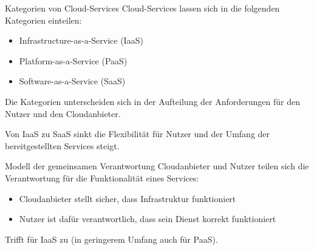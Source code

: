 
\begin{flashcard}[Definition]{Kategorien von Cloud-Services}
    Cloud-Services lassen sich in die folgenden Kategorien einteilen:
    \begin{itemize}
        \item Infrastructure-as-a-Service (IaaS)
        \item Platform-as-a-Service (PaaS)
        \item Software-as-a-Service (SaaS)
    \end{itemize}
    Die Kategorien unterscheiden sich in der Aufteilung der Anforderungen für den Nutzer und den Cloudanbieter.

    Von IaaS zu SaaS sinkt die Flexibilität für Nutzer und der Umfang der bereitgestellten Services steigt.

\end{flashcard}

\begin{flashcard}[Definition]{Modell der gemeinsamen Verantwortung}
    Cloudanbieter und Nutzer teilen sich die Verantwortung für die Funktionalität eines Services:
    \begin{itemize}
        \item Cloudanbieter stellt sicher, dass Infrastruktur funktioniert
        \item Nutzer ist dafür verantwortlich, dass sein Dienst korrekt funktioniert
    \end{itemize}
    Trifft für IaaS zu (in geringerem Umfang auch für PaaS).
\end{flashcard}

